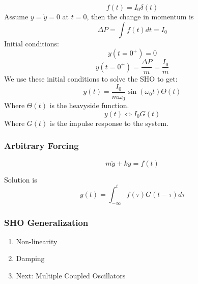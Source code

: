 \documentclass{article}
\newtheorem{one minute paper}[theorem]{One Minute Paper}
\begin{document}
\begin{equation}
    f(t) = I_0\delta(t)
\end{equation}
Assume $y = \dot{y} = 0$ at $t = 0$, then the change in momentum is
\begin{equation}
    \Delta P = \int f(t) dt = I_0
\end{equation}
Initial conditions:
\begin{equation}
    y(t = 0^{+}) = 0
\end{equation}
\begin{equation}
    y(t=0^{+}) = \frac{\Delta P}{m} = \frac{I_0}{m}
\end{equation}
We use these initial conditions to solve the SHO to get:
\begin{equation}
    y(t) = \frac{I_0}{m\omega_0}\sin(\omega_0 t)\Theta(t)
\end{equation}
Where $\Theta(t)$ is the heavyside function. 
\begin{equation}
    y(t) \iff I_0G(t)
\end{equation}
Where $G(t)$ is the impulse response to the system. 

\subsubsection*{Arbitrary Forcing}

\begin{equation}
    m\ddot{y} + ky = f(t)
\end{equation}

Solution is
\begin{equation}
    y(t) = \int_{-\infty}^{t}f(\tau)G(t-\tau)d\tau
\end{equation}

\subsubsection*{SHO Generalization}
\begin{enumerate}
    \item Non-linearity
    \item Damping
    \item Next: Multiple Coupled Oscillators
\end{enumerate}
\end{document}
